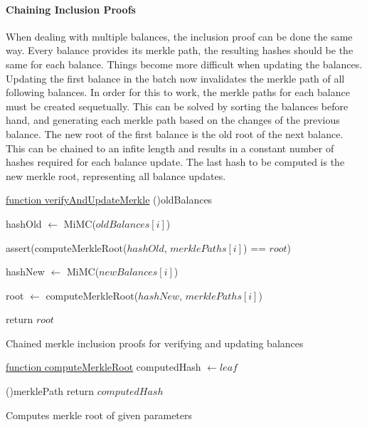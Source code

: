 \documentclass[../../thesis.tex]{subfiles}
\begin{document}
\paragraph{Chaining Inclusion Proofs} \label{chain_inclusion}
When dealing with multiple balances, the inclusion proof can be done the same way. Every balance provides its merkle path, the resulting hashes should be the same for each balance. Things become more difficult when updating the balances. Updating the first balance in the batch now invalidates the merkle path of all following balances. In order for this to work, the merkle paths for each balance must be created sequetually. This can be solved by sorting the balances before hand, and generating each merkle path based on the changes of the previous balance. The new root of the first balance is the old root of the next balance. This can be chained to an infite length and results in a constant number of hashes required for each balance update. The last hash to be computed is the new merkle root, representing all balance updates.


\begin{algorithm}

    \underline{function verifyAndUpdateMerkle}\;
    \ForEach(){oldBalances}
    {
        hashOld $\gets$ MiMC($oldBalances[i]$) 

        assert(computeMerkleRoot($hashOld$, $merklePaths[i]$) == $root$)

        hashNew $\gets$ MiMC($newBalances[i]$)

        root $\gets$ computeMerkleRoot($hashNew$, $merklePaths[i]$)
    }

    return $root$

    \caption{Chained merkle inclusion proofs for verifying and updating balances}
\end{algorithm}

\begin{algorithm}

    \underline{function computeMerkleRoot}\;
    computedHash $\gets leaf$

    \ForEach(){merklePath}
    {
    }
    return $computedHash$
    \caption{Computes merkle root of given parameters}
\end{algorithm}
\end{document}
